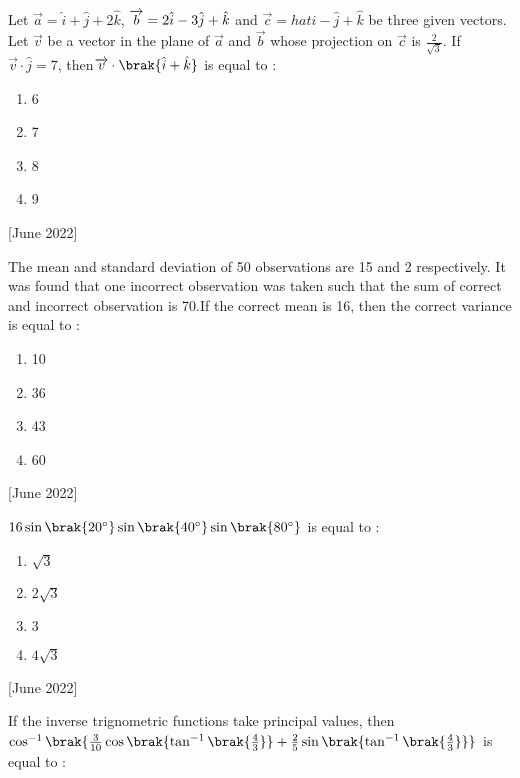 \iffalse
\title{Assignment 3}
\author{AI24BTECH11018}
\section{mcq-single}
\fi

    \item[1.] Let $\overrightarrow{a}=\hat{i}+\hat{j}+2\hat{k}$, $\overrightarrow{b}=2\hat{i}-3\Hat{j}+\hat{k}$ and $\overrightarrow{c}=hat{i}-\hat{j}+\hat{k}$ be three given vectors. Let $\overrightarrow{v}$ be a vector in the plane of $\overrightarrow{a}$ and $\overrightarrow{b}$ whose projection on $\overrightarrow{c}$ is $\frac{2}{\sqrt{3}}$. If $\overrightarrow{v}\cdot\hat{j}=7$, then$\overrightarrow{v}\cdot\brak{\hat{i}+\hat{k}}$ is equal to :
    \begin{enumerate}
        \item 6
        \item 7
        \item 8
        \item 9
    \end{enumerate}
    \hfill{[June 2022]}
    \item[2.] The mean and standard deviation of 50 observations are 15 and 2 respectively. It was found that one incorrect observation was taken such that the sum of correct and incorrect observation is 70.If the correct mean is 16, then the correct variance is equal to :
    \begin{enumerate}
        \item 10
        \item 36
        \item 43
        \item 60
    \end{enumerate}
    \hfill{[June 2022]}
    \item[3.] $16\sin{\brak{20^\circ}}\sin{\brak{40^\circ}}\sin{\brak{80^\circ}}$ is equal to :
    \begin{enumerate}
        \item $\sqrt{3}$
        \item $2\sqrt{3}$
        \item $3$
        \item $4\sqrt{3}$
    \end{enumerate}
    \hfill{[June 2022]}
    \item[4.] If the inverse trignometric functions take principal values, then $\cos^{-1}\brak{\frac{3}{10}\cos\brak{\tan^{-1}\brak{\frac{4}{3}}}+\frac{2}{5}\sin\brak{\tan^{-1}\brak{\frac{4}{3}}}}$ is equal to :
